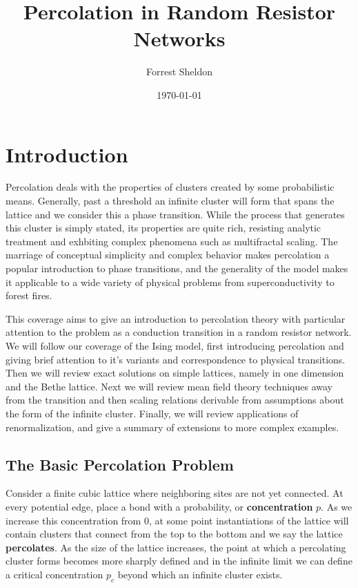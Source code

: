 
\usepackage{graphicx}

\title{Percolation in Random Resistor Networks}
\author{Forrest Sheldon}
\date{\today}

\maketitle

\section{Introduction}

Percolation deals with the properties of clusters created by some
probabilistic means. Generally, past a threshold an infinite cluster
will form that spans the lattice and we consider this a phase transition.
While the process that generates this cluster is simply stated, its properties
are quite rich, resisting analytic treatment and exhbiting complex phenomena
such as multifractal scaling. The marriage of conceptual simplicity and
complex behavior makes percolation a popular introduction to phase transitions,
and the generality of the model makes it applicable to a wide variety of physical
problems from superconductivity to forest fires.


This coverage aims to give an introduction to percolation theory with particular
attention to the problem as a conduction transition in a random resistor network.
We will follow our coverage of the Ising model, first introducing percolation and
giving brief attention to it's variants and correspondence to physical transitions.
Then we will
review exact solutions on simple lattices, namely in one dimension and the Bethe
lattice.  Next we will review mean field theory techniques away from the transition
and then scaling relations derivable from assumptions about the form of the
infinite cluster.  Finally, we will review applications of renormalization, and give
a summary of extensions to more complex examples.

\subsection{The Basic Percolation Problem}

Consider a finite cubic lattice where neighboring sites are not yet connected.
At every potential edge, place a bond with a probability, or \textbf{concentration}
$p$. As we increase this concentration from 0, at some point instantiations of the
lattice will contain clusters that connect from the top to the bottom and we say
the lattice \textbf{percolates}.  As the size of the lattice
increases, the point at which a percolating cluster forms becomes more sharply
defined and in the infinite limit we can define a critical concentration
$p_c$ beyond which an infinite cluster exists.

